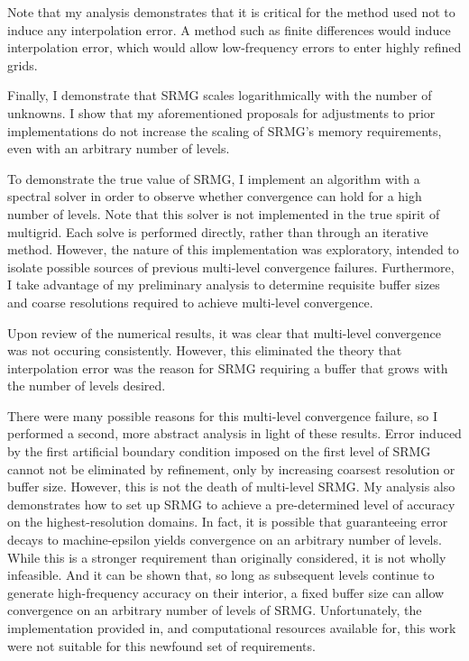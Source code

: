 \documentclass[final]{siamart1116}
\numberwithin{theorem}{section}
\begin{document}
    Note that my analysis demonstrates that it is critical for the method used not to induce any interpolation error. A method such as finite differences  would induce interpolation error, which would allow low-frequency errors to enter highly refined grids. 
    
	Finally, I demonstrate that SRMG scales logarithmically with the number of unknowns. I show that my aforementioned proposals for adjustments to prior implementations do not increase the scaling of SRMG's memory requirements, even with an arbitrary number of levels. 
    
    
    To  demonstrate the true value of SRMG, I implement an algorithm with a spectral solver in order to observe whether convergence can hold for a high number of levels. Note that this solver is not implemented in the true spirit of multigrid. Each solve is performed directly, rather than through an iterative method. However, the nature of this implementation was exploratory, intended to isolate possible sources of previous multi-level convergence failures. Furthermore, I take advantage of my preliminary analysis to determine requisite buffer sizes and coarse resolutions required to achieve multi-level convergence. 
    
    Upon review of the numerical results, it was clear that multi-level convergence was not occuring consistently. However, this eliminated the theory that interpolation error was the reason for SRMG requiring a buffer that grows with the number of levels desired. 
    
    There were many possible reasons for this multi-level convergence failure, so I performed a second, more abstract analysis in light of these results. Error induced by the first artificial boundary condition imposed on the first level of SRMG cannot not be eliminated by refinement, only by increasing coarsest resolution or buffer size. However, this is not the death of multi-level SRMG. My analysis also demonstrates how to set up SRMG to achieve a pre-determined level of accuracy on the highest-resolution domains. In fact, it is possible that guaranteeing error decays to machine-epsilon yields convergence on an arbitrary number of levels. While this is a stronger requirement than originally considered, it is not wholly infeasible. And it can be shown that, so long as subsequent levels continue to generate high-frequency accuracy on their interior, a fixed buffer size can allow convergence on an arbitrary number of levels of SRMG. Unfortunately, the implementation  provided in, and computational resources available for, this work were not suitable for this newfound set of requirements. 
    
\end{document}
